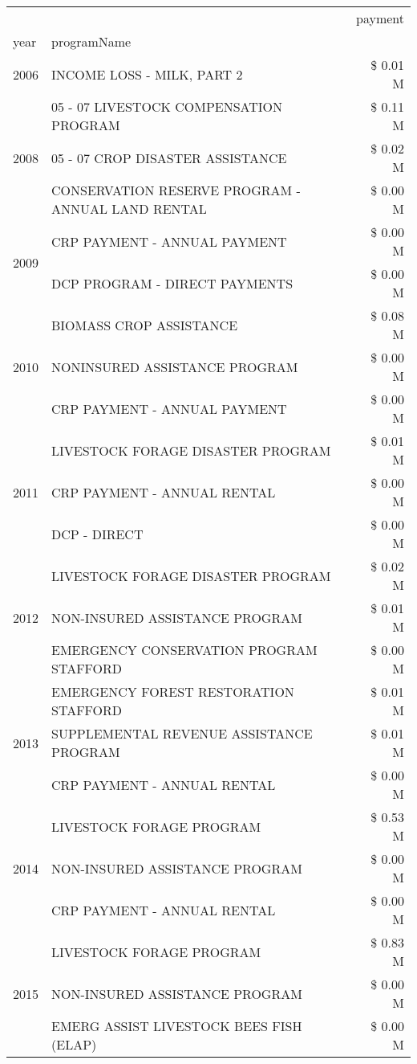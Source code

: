 \begin{tabular}{llr}
\toprule
 &  & payment \\
year & programName &  \\
\midrule
2006 & INCOME LOSS - MILK, PART 2 & \$ 0.01 M \\
\cline{1-3}
\multirow[t]{3}{*}{2008} & 05 - 07 LIVESTOCK COMPENSATION PROGRAM & \$ 0.11 M \\
 & 05 - 07 CROP DISASTER ASSISTANCE & \$ 0.02 M \\
 & CONSERVATION RESERVE PROGRAM - ANNUAL LAND RENTAL & \$ 0.00 M \\
\cline{1-3}
\multirow[t]{2}{*}{2009} & CRP PAYMENT - ANNUAL PAYMENT & \$ 0.00 M \\
 & DCP PROGRAM - DIRECT PAYMENTS & \$ 0.00 M \\
\cline{1-3}
\multirow[t]{3}{*}{2010} & BIOMASS CROP ASSISTANCE & \$ 0.08 M \\
 & NONINSURED ASSISTANCE PROGRAM & \$ 0.00 M \\
 & CRP PAYMENT - ANNUAL PAYMENT & \$ 0.00 M \\
\cline{1-3}
\multirow[t]{3}{*}{2011} & LIVESTOCK FORAGE DISASTER PROGRAM & \$ 0.01 M \\
 & CRP PAYMENT - ANNUAL RENTAL & \$ 0.00 M \\
 & DCP - DIRECT & \$ 0.00 M \\
\cline{1-3}
\multirow[t]{3}{*}{2012} & LIVESTOCK FORAGE DISASTER PROGRAM & \$ 0.02 M \\
 & NON-INSURED ASSISTANCE PROGRAM & \$ 0.01 M \\
 & EMERGENCY CONSERVATION PROGRAM STAFFORD & \$ 0.00 M \\
\cline{1-3}
\multirow[t]{3}{*}{2013} & EMERGENCY FOREST RESTORATION STAFFORD & \$ 0.01 M \\
 & SUPPLEMENTAL REVENUE ASSISTANCE PROGRAM & \$ 0.01 M \\
 & CRP PAYMENT - ANNUAL RENTAL & \$ 0.00 M \\
\cline{1-3}
\multirow[t]{3}{*}{2014} & LIVESTOCK FORAGE PROGRAM & \$ 0.53 M \\
 & NON-INSURED ASSISTANCE PROGRAM & \$ 0.00 M \\
 & CRP PAYMENT - ANNUAL RENTAL & \$ 0.00 M \\
\cline{1-3}
\multirow[t]{3}{*}{2015} & LIVESTOCK FORAGE PROGRAM & \$ 0.83 M \\
 & NON-INSURED ASSISTANCE PROGRAM & \$ 0.00 M \\
 & EMERG ASSIST LIVESTOCK BEES FISH (ELAP) & \$ 0.00 M \\

\end{tabular}
